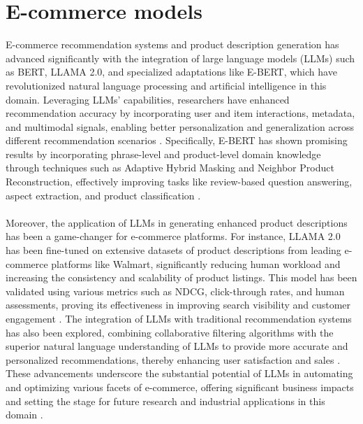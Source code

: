 \section{E-commerce models}
E-commerce recommendation systems and product description generation has advanced significantly with the integration of large language models (LLMs) such as BERT, LLAMA 2.0, and specialized adaptations like E-BERT, which have revolutionized natural language processing and artificial intelligence in this domain. Leveraging LLMs' capabilities, researchers have enhanced recommendation accuracy by incorporating user and item interactions, metadata, and multimodal signals, enabling better personalization and generalization across different recommendation scenarios \cite{xu2024emerging}. Specifically, E-BERT has shown promising results by incorporating phrase-level and product-level domain knowledge through techniques such as Adaptive Hybrid Masking and Neighbor Product Reconstruction, effectively improving tasks like review-based question answering, aspect extraction, and product classification \cite{zhang2021ebert}.
\\\\
Moreover, the application of LLMs in generating enhanced product descriptions has been a game-changer for e-commerce platforms. For instance, LLAMA 2.0 has been fine-tuned on extensive datasets of product descriptions from leading e-commerce platforms like Walmart, significantly reducing human workload and increasing the consistency and scalability of product listings. This model has been validated using various metrics such as NDCG, click-through rates, and human assessments, proving its effectiveness in improving search visibility and customer engagement \cite{zhou2023leveraging}. The integration of LLMs with traditional recommendation systems has also been explored, combining collaborative filtering algorithms with the superior natural language understanding of LLMs to provide more accurate and personalized recommendations, thereby enhancing user satisfaction and sales \cite{xu2024emerging}. These advancements underscore the substantial potential of LLMs in automating and optimizing various facets of e-commerce, offering significant business impacts and setting the stage for future research and industrial applications in this domain \cite{zhou2023leveraging}.


